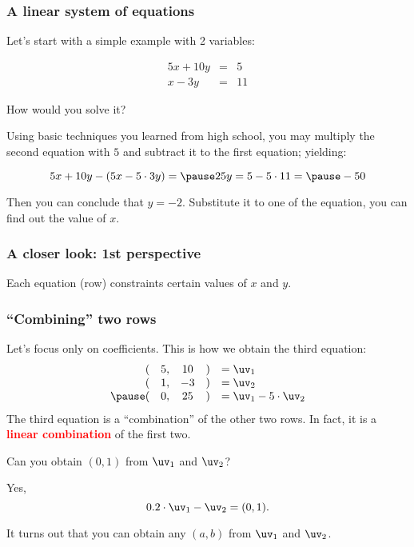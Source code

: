 

\begin{frame}\frametitle{A linear system of equations}
  Let's start with a simple example with 2 variables:

  \[
  \begin{array}{rcl}
  5x + 10y &=& 5 \\
  x - 3y &=& 11
  \end{array}
  \]

  How would you solve it?

  \pause

  Using basic techniques you learned from high school, you may
  multiply the second equation with $5$ and subtract it to the first
  equation; yielding:

  \[
    5x + 10y - (5x - 5\cdot 3y) =
    \pause 25y = 5 - 5\cdot 11 =
    \pause -50
  \]

  \pause

  Then you can conclude that $y=-2$.  Substitute it to one of the
  equation, you can find out the value of $x$.

\end{frame}

\begin{frame}
  \frametitle{A closer look: 1st perspective}
  Each equation (row) constraints certain values of $x$ and $y$.
  \vspace{2.5in}
\end{frame}

\begin{frame}
  \frametitle{``Combining'' two rows}
  Let's focus only on coefficients.
  This is how we obtain the third equation:
  \[
  \begin{array}{rccll}
    ( & 5, & 10 & ) & =\uv_1\\
    ( & 1, & -3 & ) & =\uv_2\\
    \pause
    ( & 0, & 25 & ) & =\uv_1 - 5\cdot \uv_2
  \end{array}
  \]
  \pause
  The third equation is a ``combination'' of the other two rows.  In fact, it is a \textcolor{red}{\bf linear combination} of the first two.
  \pause
  
  Can you obtain $(0,1)$ from $\uv_1$ and $\uv_2$?
  \pause
  
  Yes,
  \[
  0.2\cdot \uv_1 -\uv_2 = (0,1).
  \]
  
  It turns out that you can obtain any $(a,b)$ from $\uv_1$ and $\uv_2$.
\end{frame}

